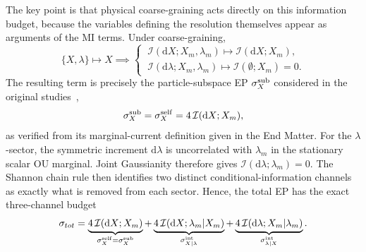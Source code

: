 \documentclass[
 longbibliography,
 twocolumn,
 superscriptaddress,
 amsmath,
 amssymb,
 amsthm,
 amsfonts,
 prl,
 floatfix,
]{revtex4-2}
\begin{document}
The key point is that physical coarse-graining acts directly on this information budget, because the variables defining the resolution themselves appear as arguments of the MI terms. Under coarse-graining,
\begin{equation*}
    \{X,\lambda\}\mapsto X
    \implies
    \begin{cases}
        \ \mathcal I(\mathrm dX;X_m,\lambda_m)
        \mapsto
        \mathcal I(\mathrm dX;X_m),
        \\
        \ \mathcal I(\mathrm d\lambda;X_m,\lambda_m)
        \mapsto
        \mathcal I(\emptyset;X_m)=0.
    \end{cases}
    \label{eq:coarse_graining_map}
\end{equation*}
The resulting term is precisely the particle-subspace EP $\sigma_X^{\rm sub}$ considered in the original studies~\cite{das2025irreversibility,das2025uraveling},
\begin{equation}
    \sigma_X^{\rm sub}=\sigma_X^{\rm self}=4\,\mathcal I(\mathrm dX;X_m),
\end{equation}
as verified from its marginal-current definition given in the End Matter.
For the $\lambda$-sector, the symmetric increment $\mathrm d\lambda$ is uncorrelated with $\lambda_m$ in the stationary scalar OU marginal. Joint Gaussianity therefore gives $\mathcal I(\mathrm d\lambda;\lambda_m)=0$.
The Shannon chain rule then identifies two distinct conditional-information channels as exactly what is removed from each sector. 
Hence, the total EP has the exact three-channel budget
\begin{equation}
    \begin{aligned}
        \sigma_{tot}
        =\underbrace{4\,\mathcal I(\mathrm dX;X_m)}_{\sigma_X^{\rm self}=\sigma_X^{\rm sub}}
        +\underbrace{4\,\mathcal I(\mathrm dX;\lambda_m|X_m)}_{\sigma_{X|\lambda}^{\rm int}}
        +\underbrace{4\,\mathcal I(\mathrm d\lambda;X_m|\lambda_m)}_{\sigma_{\lambda|X}^{\rm int}}.
    \end{aligned}
    \label{eq:Das_model_channel_decomposition}
\end{equation}
\end{document}
